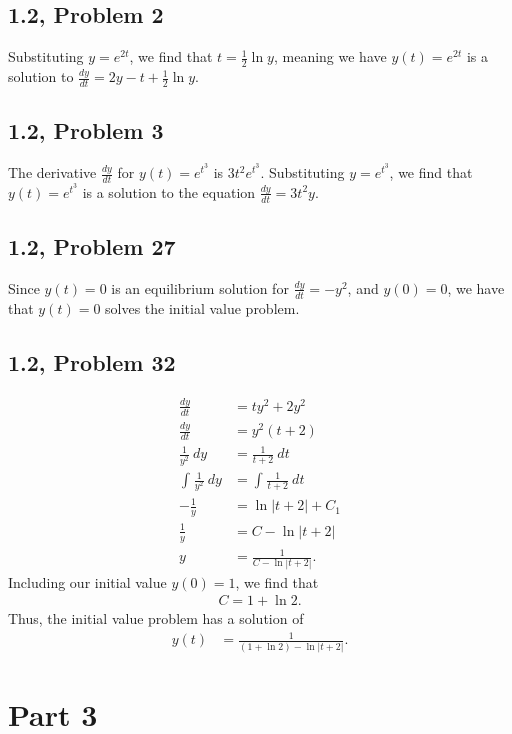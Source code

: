 \documentclass[12pt]{mypackage}
\begin{document}
\subsection{1.2, Problem 2}%
Substituting $y=e^{2t}$, we find that $t = \frac{1}{2}\ln y$, meaning we have $y(t) = e^{2t}$ is a solution to $\frac{dy}{dt} = 2y - t + \frac{1}{2}\ln y$.
\subsection{1.2, Problem 3}%
The derivative $\frac{dy}{dt}$ for $y(t) = e^{t^3}$ is $3t^2 e^{t^3}$. Substituting $y = e^{t^3}$, we find that $y(t) = e^{t^3}$ is a solution to the equation $\frac{dy}{dt} = 3t^2y$.
\subsection{1.2, Problem 27}%
Since $y(t) = 0$ is an equilibrium solution for $\frac{dy}{dt} = -y^2$, and $y(0) = 0$, we have that $y(t) = 0$ solves the initial value problem.
\subsection{1.2, Problem 32}%
\begin{align*}
  \frac{dy}{dt} &= ty^2 + 2y^2\\
  \frac{dy}{dt} &= y^2\left(t+2\right)\\
  \frac{1}{y^2}\:dy &= \frac{1}{t+2}\:dt\\
  \int_{}^{} \frac{1}{y^2}\:dy &= \int_{}^{} \frac{1}{t+2}\:dt\\
  -\frac{1}{y} &= \ln\left\vert t+2 \right\vert + C_1\\
  \frac{1}{y} &= C  - \ln \left\vert t+2 \right\vert\\
  y &= \frac{1}{C - \ln \left\vert t+2 \right\vert}.
\end{align*}
Including our initial value $y(0) = 1$, we find that
\begin{align*}
  C = 1 + \ln 2.
\end{align*}
Thus, the initial value problem has a solution of
\begin{align*}
  y(t) &= \frac{1}{\left(1 + \ln 2\right) - \ln \left\vert t+2 \right\vert}.
\end{align*}
\section{Part 3}%
\end{document}

